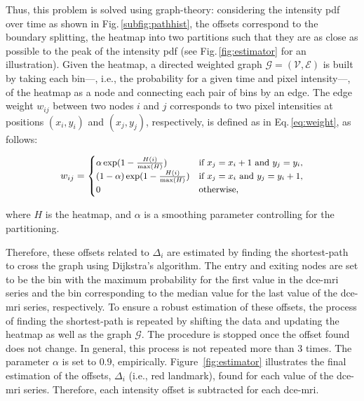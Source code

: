 \documentclass[final,3p,times,twocolumn]{elsarticle}
\begin{document}
Thus, this problem is solved using graph-theory: considering the intensity
\ac{pdf} over time as shown in Fig.\,\ref{subfig:pathhist}, the offsets
correspond to the boundary splitting, the heatmap into two partitions such that
they are as close as possible to the peak of the intensity \ac{pdf} (see
Fig.\,\ref{fig:estimator} for an illustration). Given the heatmap, a directed
weighted graph $\mathcal{G}=(\mathcal{V}, \mathcal{E})$ is built by taking each
bin---, i.e., the probability for a given time and pixel intensity---, of the
heatmap as a node and connecting each pair of bins by an edge. The edge weight
$w_{ij}$ between two nodes $i$ and $j$ corresponds to two pixel intensities at
positions $(x_i, y_i)$ and $(x_j, y_j)$, respectively, is defined as in
Eq.\,\eqref{eq:weight}, as follows:

\begin{equation}\small
  w_{ij} = \begin{cases}
    \alpha \exp(1 - \frac{H(i)}{\max(H)})       & \text{if } x_j = x_i + 1 \text{ and } y_j = y_i, \\
    (1 - \alpha) \exp(1 - \frac{H(i)}{\max(H)}) & \text{if } x_j = x_i \text{ and } y_j = y_i + 1, \\
    0                                           & \text{otherwise},
  \end{cases}
  \label{eq:weight}
\end{equation}

\noindent where $H$ is the heatmap, and $\alpha$ is a smoothing parameter
controlling for the partitioning.

Therefore, these offsets related to $\Delta_i$ are estimated by finding the
shortest-path to cross the graph using Dijkstra's algorithm.  The entry and
exiting nodes are set to be the bin with the maximum probability for the first
value in the \ac{dce}-\ac{mri} series and the bin corresponding to the median
value for the last value of the \ac{dce}-\ac{mri} series, respectively.  To
ensure a robust estimation of these offsets, the process of finding the
shortest-path is repeated by shifting the data and updating the heatmap as well
as the graph $\mathcal{G}$. The procedure is stopped once the offset found does
not change. In general, this process is not repeated more than 3 times.  The
parameter $\alpha$ is set to $0.9$, empirically. Figure~\ref{fig:estimator}
illustrates the final estimation of the offsets, $\Delta_i$ (i.e., red
landmark), found for each value of the \ac{dce}-\ac{mri} series.  Therefore,
each intensity offset is subtracted for each \ac{dce}-\ac{mri}.
\end{document}
